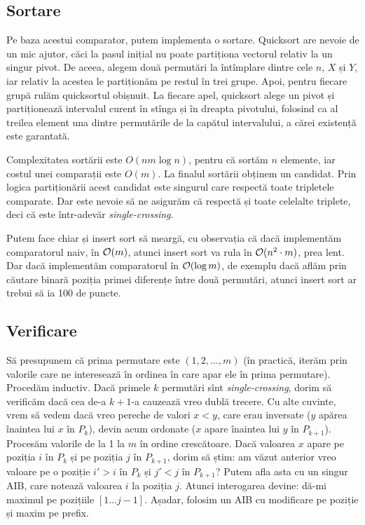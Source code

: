 \documentclass[../main.tex]{subfiles}
\begin{document}
\subsection{Sortare}

Pe baza acestui comparator, putem implementa o sortare. Quicksort are nevoie de un mic ajutor, căci la pasul inițial nu poate partiționa vectorul relativ la un singur pivot. De aceea, alegem două permutări la întîmplare dintre cele $n$, $X$ și $Y$, iar relativ la acestea le partiționăm pe restul în trei grupe. Apoi, pentru fiecare grupă rulăm quicksortul obișnuit. La fiecare apel, quicksort alege un pivot și partiționează intervalul curent în stînga și în dreapta pivotului, folosind ca al treilea element una dintre permutările de la capătul intervalului, a cărei existență este garantată.

Complexitatea sortării este $O(nm \log n)$, pentru că sortăm $n$ elemente, iar costul unei comparații este $O(m)$. La finalul sortării obținem un candidat. Prin logica partiționării acest candidat este singurul care respectă toate tripletele comparate. Dar este nevoie să ne asigurăm că respectă și toate celelalte triplete, deci că este într-adevăr \textit{single-crossing}.

Putem face chiar și insert sort să meargă, cu observația că dacă implementăm comparatorul naiv, în $\mathcal{O}(m)$, atunci insert sort va rula în $\mathcal{O}(n^2 \cdot m)$, prea lent. Dar dacă implementăm comparatorul în $\mathcal{O}(\log m)$, de exemplu dacă aflăm prin căutare binară poziția primei diferențe între două permutări, atunci insert sort ar trebui să ia 100 de puncte.

\subsection{Verificare}

Să presupunem că prima permutare este $(1, 2, \dots, m)$ (în practică, iterăm prin valorile care ne interesează în ordinea în care apar ele în prima permutare). Procedăm inductiv. Dacă primele $k$ permutări sînt \textit{single-crossing}, dorim să verificăm dacă cea de-a $k+1$-a cauzează vreo dublă trecere. Cu alte cuvinte, vrem să vedem dacă vreo pereche de valori $x < y$, care erau inversate ($y$ apărea înaintea lui $x$ în $P_k$), devin acum ordonate ($x$ apare înaintea lui $y$ în $P_{k+1}$). Procesăm valorile de la 1 la $m$ în ordine crescătoare. Dacă valoarea $x$ apare pe poziția $i$ în $P_k$ și pe poziția $j$ în $P_{k+1}$, dorim să știm: am văzut anterior vreo valoare pe o poziție $i' > i$ în $P_k$ și $j' < j$ în $P_{k+1}$? Putem afla asta cu un singur AIB, care notează valoarea $i$ la poziția $j$. Atunci interogarea devine: dă-mi maximul pe pozițiile $[1 \dots j-1]$. Așadar, folosim un AIB cu modificare pe poziție și maxim pe prefix.
\end{document}

